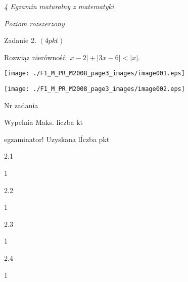 \documentclass[a4paper,12pt]{article}
\begin{document}
{\it 4 Egzamin maturalny z matematyki}

{\it Poziom rozszerzony}

Zadanie 2. $(4pkt)$

Rozwiąz nierówność $|x-2|+|3x-6|<|x|.$
\begin{center}
\texttt{[image: ./F1\_M\_PR\_M2008\_page3\_images/image001.eps]}

\texttt{[image: ./F1\_M\_PR\_M2008\_page3\_images/image002.eps]}
\end{center}
Nr zadania

Wypelnia Maks. liczba kt

egzaminator! Uzyskana lÍczba pkt

2.1

1

2.2

1

2.3

1

2.4

1
\end{document}
